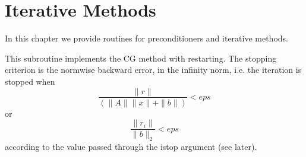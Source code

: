 \section{Iterative Methods}
\label{sec:methods}

In this chapter we provide routines for preconditioners and iterative
methods. 


%
%


This subroutine implements the CG method with restarting. The
stopping criterion is the normwise backward error, in the infinity
norm, i.e. the iteration is stopped when 
\[ \frac{\|r\|}{(\|A\|\|x\|+\|b\|)} < eps \]
or
\[ \frac{\|r_i\|}{\|b\|_2} < eps \]
according to the value passed through the  istop argument (see later).



